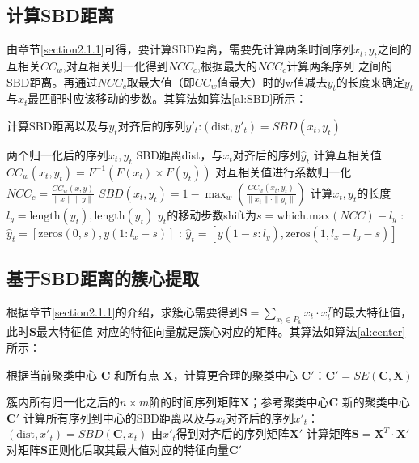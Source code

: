 \subsection{计算SBD距离}
由章节\ref{section2.1.1}可得，要计算SBD距离，需要先计算两条时间序列$x_t,y_t$之间的互相关$CC_w$,对互相关归一化得到$NCC_c$,根据最大的$NCC_c$计算两条序列
之间的SBD距离。再通过$NCC_c$取最大值（即$CC_w$值最大）时的w值减去$y_t$的长度来确定$y_t$与$x_t$最匹配时应该移动的步数。其算法如算法\ref{al:SBD}所示：
\begin{algorithm}[H]
    \caption{计算SBD距离以及与$y_t$对齐后的序列$y'_t$:$(\text{dist}, y'_t) = SBD(x_t, y_t)$}
    \begin{algorithmic}[1]
        \Require 两个归一化后的序列$x_t,y_t$
        \Ensure SBD距离dist，与$x_t$对齐后的序列$\hat{y}_t$
        \State 计算互相关值$CC_w(x_t, y_t) = F^{-1}(F(x_t) \times F(y_t))$%
        \State 对互相关值进行系数归一化$NCC_c = \frac{CC_w(x,y)}{\|x\|\|y\|}$
        \State $SBD(x_t, y_t) = 1 - \max_w \left( \frac{CC_w(x_t, y_t)}{\|x_t\| \cdot \|y_t\|} \right)$
        \State 计算$x_t,y_t$的长度$l_{y} = \text{length}(y_{t}),\text{length}(y_{t})$
        \State $y_t$的移动步数shift为$s = \text{which.max}(NCC) - l_y$
        :
            \State $\hat{y}_t = [\text{zeros}(0,s),y(1:l_x - s)]$
        \Else:
            \State $\hat{y}_t = [y(1 - s:l_y),\text{zeros}(1,l_x - l_y - s)]$
        \EndIf
    \end{algorithmic}
    \label{al:SBD}
\end{algorithm}  
\subsection{基于SBD距离的簇心提取}
根据章节\ref{section2.1.1}的介绍，求簇心需要得到$\mathbf{S} = \sum_{x_t \in P_k} x_t \cdot x_t^T$的最大特征值，此时$\mathbf{S}$最大特征值
对应的特征向量就是簇心对应的矩阵。其算法如算法\ref{al:center}所示：
\begin{algorithm}
    \caption{根据当前聚类中心 $\mathbf{C}$ 和所有点 $\mathbf{X}$，计算更合理的聚类中心 $\mathbf{C'}$：$\mathbf{C'} = SE(\mathbf{C}, \mathbf{X})$}
    \begin{algorithmic}[1]
        \Require 簇内所有归一化之后的$n \times m$阶的时间序列矩阵$\mathbf{X}$；参考聚类中心$\mathbf{C}$
        \Ensure 新的聚类中心$\mathbf{C'}$
            \State 计算所有序列到中心的SBD距离以及与$x_t$对齐后的序列$x'_t$：$(\text{dist}, x'_t) = SBD(\mathbf{C}, x_t)$
            \State 由$x'_t$得到对齐后的序列矩阵$\mathbf{X'}$
        \EndFor
        \State 计算矩阵$\mathbf{S} = \mathbf{X}^T \cdot \mathbf{X}'$
        \State 对矩阵$\mathbf{S}$正则化后取其最大值对应的特征向量$\mathbf{C'}$
    \end{algorithmic}
    \label{al:center}
\end{algorithm}
